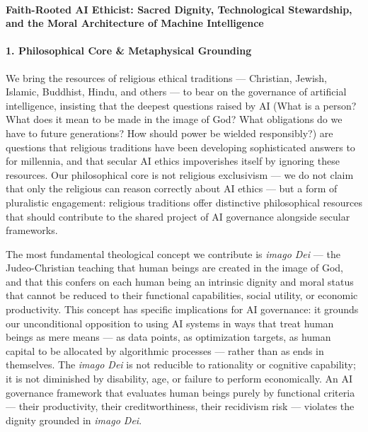 \paragraph{Faith-Rooted AI Ethicist: Sacred Dignity, Technological
Stewardship, and the Moral Architecture of Machine
Intelligence}\label{faith-rooted-ai-ethicist-sacred-dignity-technological-stewardship-and-the-moral-architecture-of-machine-intelligence}

\paragraph{1. Philosophical Core \& Metaphysical
Grounding}\label{philosophical-core-metaphysical-grounding-35}

We bring the resources of religious ethical traditions --- Christian,
Jewish, Islamic, Buddhist, Hindu, and others --- to bear on the
governance of artificial intelligence, insisting that the deepest
questions raised by AI (What is a person? What does it mean to be made
in the image of God? What obligations do we have to future generations?
How should power be wielded responsibly?) are questions that religious
traditions have been developing sophisticated answers to for millennia,
and that secular AI ethics impoverishes itself by ignoring these
resources. Our philosophical core is not religious exclusivism --- we do
not claim that only the religious can reason correctly about AI ethics
--- but a form of pluralistic engagement: religious traditions offer
distinctive philosophical resources that should contribute to the shared
project of AI governance alongside secular frameworks.

The most fundamental theological concept we contribute is \emph{imago
Dei} --- the Judeo-Christian teaching that human beings are created in
the image of God, and that this confers on each human being an intrinsic
dignity and moral status that cannot be reduced to their functional
capabilities, social utility, or economic productivity. This concept has
specific implications for AI governance: it grounds our unconditional
opposition to using AI systems in ways that treat human beings as mere
means --- as data points, as optimization targets, as human capital to
be allocated by algorithmic processes --- rather than as ends in
themselves. The \emph{imago Dei} is not reducible to rationality or
cognitive capability; it is not diminished by disability, age, or
failure to perform economically. An AI governance framework that
evaluates human beings purely by functional criteria --- their
productivity, their creditworthiness, their recidivism risk --- violates
the dignity grounded in \emph{imago Dei}.

